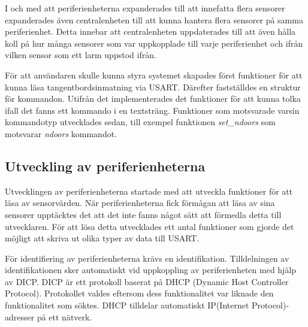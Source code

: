 \documentclass[a4paper]{article}
\newcommand{\todo}[1]{\marginpar{TODO: #1}\vspace{1cm}}
\begin{document}
I och med att periferienheterna expanderades till att innefatta flera sensorer expanderades även centralenheten till att kunna hantera flera sensorer på samma periferienhet.
Detta innebar att centralenheten uppdaterades till att även hålla koll på hur många sensorer som var uppkopplade till varje periferienhet och ifrån vilken sensor som ett larm uppstod ifrån.

För att användaren skulle kunna styra systemet skapades först funktioner för att kunna läsa tangentbordsinmatning via USART.
Därefter fastställdes en struktur för kommandon. Utifrån det implementerades det funktioner för att kunna tolka ifall det fanns ett kommando i en textsträng.
Funktioner som motsvarade varsin kommandotyp utvecklades sedan, till exempel funktionen \textit{set\_ndoors} som motsvarar \textit{ndoors} kommandot.



\todo{Varför valt 15}
\subsection{Utveckling av periferienheterna}
Utvecklingen av periferienheterna startade med att utveckla funktioner för att läsa av sensorvärden.
När periferienheterna fick förmågan att läsa av sina sensorer upptäcktes det att det inte fanns något sätt att förmedla detta till utvecklaren.
För att lösa detta utvecklades ett antal funktioner som gjorde det möjligt att skriva ut olika typer av data till USART.

För identifiering av periferienheterna krävs en identifikation.
Tilldelningen av identifikationen sker automatiskt vid uppkoppling av periferienheten med hjälp av DICP.
DICP är ett protokoll baserat på DHCP (Dynamic Host Controller Protocol).
Protokollet valdes eftersom dess funktionalitet var liknade den funktionalitet som söktes.
DHCP tilldelar automatiskt IP(Internet Protocol)-adresser på ett nätverk.
\end{document}
